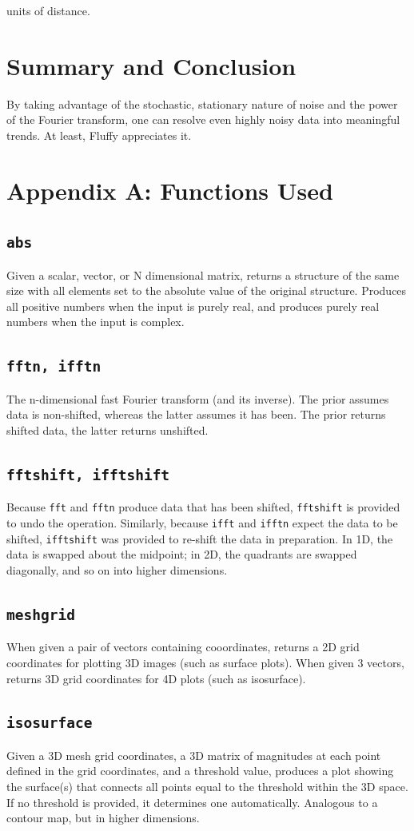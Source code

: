 \documentclass[journal]{IEEEtran}
\def\code#1{\texttt{#1}}
\begin{document}
\noindent units of distance.

\section{Summary and Conclusion}
By taking advantage of the stochastic, stationary nature of noise and the power of the Fourier transform, one can resolve even highly noisy data into meaningful trends. At least, Fluffy appreciates it.

\newpage
\clearpage
\newpage
\section{Appendix A: Functions Used}
\subsection{\code{abs}}
Given a scalar, vector, or N dimensional matrix, returns a structure of the same size with all elements set to the absolute value of the original structure. Produces all positive numbers when the input is purely real, and produces purely real numbers when the input is complex.
\subsection{\code{fftn, ifftn}}
The n-dimensional fast Fourier transform (and its inverse). The prior assumes data is non-shifted, whereas the latter assumes it has been. The prior returns shifted data, the latter returns unshifted.
\subsection{\code{fftshift, ifftshift}}
Because \code{fft} and \code{fftn} produce data that has been shifted, \code{fftshift} is provided to undo the operation. Similarly, because \code{ifft} and \code{ifftn} expect the data to be shifted, \code{ifftshift} was provided to re-shift the data in preparation. In 1D, the data is swapped about the midpoint; in 2D, the quadrants are swapped diagonally, and so on into higher dimensions.
\subsection{\code{meshgrid}}
When given a pair of vectors containing cooordinates, returns a 2D grid coordinates for plotting 3D images (such as surface plots). When given 3 vectors, returns 3D grid coordinates for 4D plots (such as isosurface).
\subsection{\code{isosurface}}
Given a 3D mesh grid coordinates, a 3D matrix of magnitudes at each point defined in the grid coordinates, and a threshold value, produces a plot showing the surface(s) that connects all points equal to the threshold within the 3D space. If no threshold is provided, it determines one automatically. Analogous to a contour map, but in higher dimensions.
\end{document}
